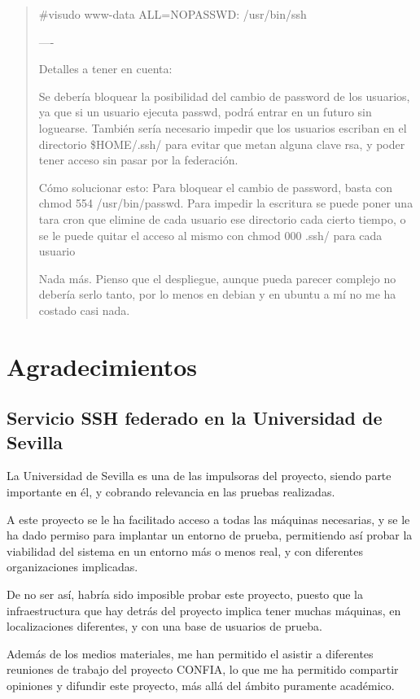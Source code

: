 \begin{quote}
\#visudo
www-data ALL=NOPASSWD: /usr/bin/ssh

----

Detalles a tener en cuenta:

Se debería bloquear la posibilidad del cambio de password de los
usuarios, ya que si un usuario ejecuta passwd, podrá entrar en un futuro
sin loguearse.
También sería necesario impedir que los usuarios escriban en el
directorio \$HOME/.ssh/ para evitar que metan alguna clave rsa, y poder
tener acceso sin pasar por la federación.

Cómo solucionar esto:
Para bloquear el cambio de password, basta con chmod
554 /usr/bin/passwd.
Para impedir la escritura se puede poner una tara cron que elimine de
cada usuario ese directorio cada cierto tiempo, o se le puede quitar el
acceso al mismo con chmod 000 .ssh/ para cada usuario


Nada más. Pienso que el despliegue, aunque pueda parecer complejo no
debería serlo tanto, por lo menos en debian y en ubuntu a mí no me ha
costado casi nada.


    \end{quote}

\chapter{Agradecimientos}

\section{Servicio SSH federado en la Universidad de Sevilla}

    La Universidad de Sevilla es una de las impulsoras del proyecto, siendo
    parte importante en él, y cobrando relevancia en las pruebas
    realizadas.

    A este proyecto se le ha facilitado acceso a todas las máquinas
    necesarias, y se le ha dado permiso para implantar un entorno de
    prueba, permitiendo así probar la viabilidad del sistema en un entorno
    más o menos real, y con diferentes organizaciones implicadas.

    De no ser así, habría sido imposible probar este proyecto, puesto que
    la infraestructura que hay detrás del proyecto implica tener muchas
    máquinas, en localizaciones diferentes, y con una base de usuarios de
    prueba.

    Además de los medios materiales, me han permitido el asistir a
    diferentes reuniones de trabajo del proyecto CONFIA, lo que me ha
    permitido compartir opiniones y difundir este proyecto, más allá del
    ámbito puramente académico.

